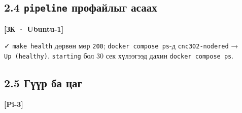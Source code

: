 \begin{Shaded}
\begin{Highlighting}[]
\end{Highlighting}
\end{Shaded}

\hypertarget{pipeline-ux43fux440ux43eux444ux430ux439ux43bux44bux433-ux430ux441ux430ux430ux445}{%
\subsection{\texorpdfstring{2.4 \texttt{pipeline} профайлыг асаах}{2.4 pipeline профайлыг асаах}}\label{pipeline-ux43fux440ux43eux444ux430ux439ux43bux44bux433-ux430ux441ux430ux430ux445}}

\textbf{{[}ЗК · Ubuntu-1{]}}

\begin{Shaded}
\begin{Highlighting}[]
\KeywordTok{\&\&} \KeywordTok{\&\&} 
\KeywordTok{;} 
\end{Highlighting}
\end{Shaded}

✓ \texttt{make\ health} дөрвөн мөр \texttt{200}; \texttt{docker\ compose\ ps}-д \texttt{cnc302-nodered} → \texttt{Up\ (healthy)}. \texttt{starting} бол 30 сек хүлээгээд дахин \texttt{docker\ compose\ ps}.

\hypertarget{ux433ux4afux4afux440-ux431ux430-ux446ux430ux433}{%
\subsection{2.5 Гүүр ба цаг}\label{ux433ux4afux4afux440-ux431ux430-ux446ux430ux433}}

\textbf{{[}Pi-3{]}}

\begin{Shaded}
\begin{Highlighting}[]
\KeywordTok{\&\&} \KeywordTok{\&\&} \KeywordTok{\&\&} 
\end{Highlighting}
\end{Shaded}

